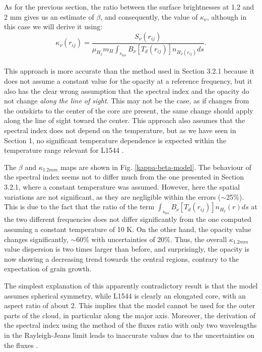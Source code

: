 \documentclass{aa}
\begin{document}
As for the previous section, the ratio between the surface brightnesses at 1.2 and 2 mm gives us an estimate of $\beta$, and consequently, the value of $\kappa_{\nu}$, although in this case we will derive it using:
\begin{equation}
\kappa_{\nu}(r_{ij}) = \frac{S_{\nu}(r_{ij})}{ \mu_{H_2} m_{H}   \int_{s_{los}}^{}{B_{\nu}[T_{d}(r_{ij})]n_{H_{2}(r_{ij})} ds} }.
\label{opacity_eq}
\end{equation} 
\\

This approach is more accurate than the method used in Section 3.2.1 because it does not assume a constant value for the opacity at a reference frequency, but it also has the clear wrong assumption that the spectral index and the opacity do not change \textit{along the line of sight}. This may not be the case, as if changes from the outskirts to the center of the core are present, the same change should apply along the line of sight toward the center. This approach also assumes that the spectral index does not depend on the temperature, but as we have seen in Section 1, no significant temperature dependence is expected within the temperature range relevant for L1544 \citep[e.g.]{1996ApJ...462.1026A, 1998ApJ...496.1058M,2005ApJ...633..272B,2011A&A...535A.124C,2013lcdu.confE..44D}.

The $\beta$ and $\kappa_{1.2mm}$ maps are shown in Fig. \ref{kappa-beta-model}. The behaviour of the spectral index seems not to differ much from the one presented in Section 3.2.1, where a constant temperature was assumed. However, here the spatial variations are not significant, as they are negligible within the errors ($\sim$25\%). This is due to the fact that the ratio of the term $\int_{s_{los}}^{}{B_{\nu}[T_{d}(r_{ij})]n_{H_{2}}(r) ds}$ at the two different frequencies does not differ significantly from the one computed assuming a constant temperature of 10 K. On the other hand, the opacity value changes significantly, $\sim$60\% with uncertainties of 20\%. Thus, the overall $\kappa_{1.2mm}$ value dispersion is two times larger than before, and surprisingly, the opacity is now showing a decreasing trend towards the central regions, contrary to the expectation of grain growth. 

The simplest explanation of this apparently contradictory result is that the model assumes spherical symmetry, while L1544 is clearly an elongated core, with an aspect ratio of about 2. This implies that the model cannot be used for the outer parts of the cloud, in particular along the major axis. Moreover, the derivation of the spectral index using the method of the fluxes ratio with only two wavelengths in the Rayleigh-Jeans limit leads to inaccurate values due to the uncertainties on the fluxes . 
\end{document}
